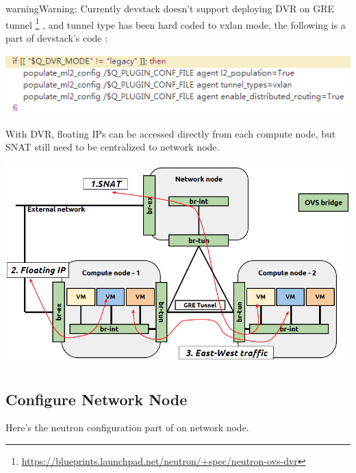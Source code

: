 \documentclass[letterpaper,10pt,english]{sphinxmanual}
\begin{document}
\begin{notice}{warning}{Warning:}
Currently devstack doesn't support deploying DVR on GRE tunnel \footnote{
\href{https://blueprints.launchpad.net/neutron/+spec/neutron-ovs-dvr}{https://blueprints.launchpad.net/neutron/+spec/neutron-ovs-dvr}
} , and tunnel type has been hard coded to vxlan mode, the following is a part of devstack's code :
\end{notice}

\includegraphics{image2.png}

With DVR, floating IPs can be accessed directly from each compute node, but SNAT still need to be centralized to network node.

\includegraphics{image3.png}


\subsection{Configure Network Node}
\label{docs/enable_dvr_with_devstack/index:configure-network-node}
Here's the neutron configuration part of  on network node.
\end{document}

